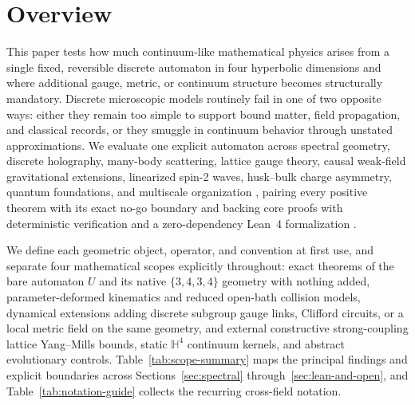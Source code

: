 \section{Overview}
\label{sec:overview}

This paper tests how much continuum-like mathematical physics arises from a single fixed, reversible discrete automaton
in four hyperbolic dimensions and where additional gauge, metric, or continuum structure becomes structurally mandatory.
Discrete microscopic models routinely fail in one of two opposite ways: either they remain too simple to support bound
matter, field propagation, and classical records, or they smuggle in continuum behavior through unstated approximations.
We evaluate one explicit automaton across spectral geometry, discrete holography, many-body scattering, lattice gauge
theory, causal weak-field gravitational extensions, linearized spin-2 waves, husk--bulk charge asymmetry, quantum
foundations, and multiscale organization \cite{schumacher2004, arrighi2019, farrelly2020}, pairing every positive
theorem with its exact no-go boundary and backing core proofs with deterministic verification and a zero-dependency
Lean~4 formalization \cite{demoura2021lean4, cluesurf2026repo}.

We define each geometric object, operator, and convention at first use, and separate four mathematical scopes explicitly
throughout: exact theorems of the bare automaton $U$ and its native $\{3,4,3,4\}$ geometry with nothing added,
parameter-deformed kinematics and reduced open-bath collision models, dynamical extensions adding discrete subgroup
gauge links, Clifford circuits, or a local metric field on the same geometry, and external constructive strong-coupling
lattice Yang--Mills bounds, static $\mathbb{H}^4$ continuum kernels, and abstract evolutionary controls.
Table~\ref{tab:scope-summary} maps the principal findings and explicit boundaries across Sections~\ref{sec:spectral}
through~\ref{sec:lean-and-open}, and Table~\ref{tab:notation-guide} collects the recurring cross-field notation.

